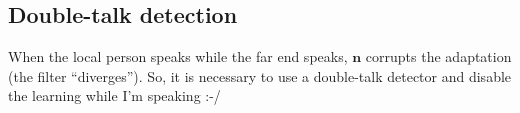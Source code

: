 \subsection{Double-talk detection}
When the local person speaks while the far end speaks, $\mathbf{n}$
corrupts the adaptation (the filter “diverges”). So, it is necessary
to use a double-talk detector and disable the learning while I'm
speaking :-/

